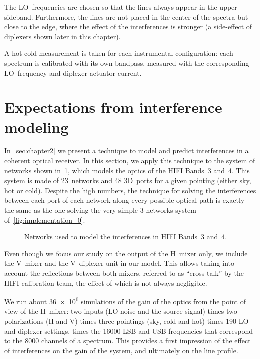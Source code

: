 The LO~frequencies are chosen so that the lines always appear in the upper sideband.
Furthermore, the lines are not placed in the center of the spectra but close to the edge, where the effect of the interferences is stronger (a side-effect of diplexers shown later in this chapter).

A hot-cold measurement is taken for each instrumental configuration: each spectrum is calibrated with its own bandpass, measured with the corresponding LO~frequency and diplexer actuator current.




\FloatBarrier
\section{Expectations from interference modeling}
\label{sec:s141_interf}
In~\cref{sec:chapter2} we present a technique to model and predict interferences in a coherent optical receiver.
In this section, we apply this technique to the system of networks shown in~\cref{fig:band45_networks}, which models the optics of the HIFI Bands~3 and~4.
This system is made of 23~networks and 48 3D~ports for a given pointing (either sky, hot or cold).
Despite the high numbers, the technique for solving the interferences between each port of each network along every possible optical path is exactly the same as the one solving the very simple 3-networks system of~\vref{fig:implementation_0}.

\begin{figure}[b]
    \centering
    
    \caption{Networks used to model the interferences in HIFI Bands~3 and~4.}
    \label{fig:band45_networks}
\end{figure}

Even though we focus our study on the output of the H~mixer only, we include the V~mixer and the V~diplexer unit in our model.
This allows taking into account the reflections between both mixers, referred to as ``cross-talk'' by the HIFI calibration team, the effect of which is not always negligible.

We run about \num{36e6} simulations of the gain of the optics from the point of view of the H~mixer: two inputs (LO noise and the source signal) times two polarizations (H and V) times three pointings (sky, cold and hot) times 190 LO and diplexer settings, times the \num{16000} LSB and USB frequencies that correspond to the 8000 channels of a spectrum.
This provides a first impression of the effect of interferences on the gain of the system, and ultimately on the line profile.

